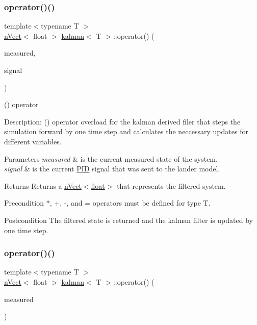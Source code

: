 \subsubsection{\texorpdfstring{operator()()}{operator()()}\hspace{0.1cm}{\footnotesize\ttfamily [1/2]}}
{\footnotesize\ttfamily template$<$typename T $>$ \\
\hyperlink{classnVect}{n\+Vect}$<$ float $>$ \hyperlink{classkalman}{kalman}$<$ T $>$\+::operator() (\begin{DoxyParamCaption}\item[{const \hyperlink{classnVect}{n\+Vect}$<$ T $>$ \&}]{measured,  }\item[{const float}]{signal }\end{DoxyParamCaption})}



() operator 

Description\+: () operator overload for the kalman derived filer that steps the simulation forward by one time step and calculates the neccessary updates for different variables. 
\begin{DoxyParams}{Parameters}
{\em measured} & is the current measured state of the system. \\
\hline
{\em signal} & is the current \hyperlink{classPID}{P\+ID} signal that was sent to the lander model. \\
\hline
\end{DoxyParams}
\begin{DoxyReturn}{Returns}
Returns a \hyperlink{classnVect}{n\+Vect$<$float$>$} that represents the filtered system. 
\end{DoxyReturn}
\begin{DoxyPrecond}{Precondition}
$\ast$, +, -\/, and = operators must be defined for type T. 
\end{DoxyPrecond}
\begin{DoxyPostcond}{Postcondition}
The filtered state is returned and the kalman filter is updated by one time step. 
\end{DoxyPostcond}
\mbox{\label{classkalman_ae3c0c97ba8c3eb2eba0134a3adf701ed}} 
\subsubsection{\texorpdfstring{operator()()}{operator()()}\hspace{0.1cm}{\footnotesize\ttfamily [2/2]}}
{\footnotesize\ttfamily template$<$typename T $>$ \\
\hyperlink{classnVect}{n\+Vect}$<$ float $>$ \hyperlink{classkalman}{kalman}$<$ T $>$\+::operator() (\begin{DoxyParamCaption}\item[{\hyperlink{classnVect}{n\+Vect}$<$ T $>$ \&}]{measured }\end{DoxyParamCaption})\hspace{0.3cm}{\ttfamily [virtual]}}



